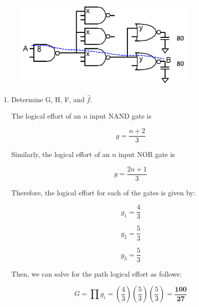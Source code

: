\documentclass[fleqn]{article}
\begin{document}
\begin{enumerate}
			\begin{figure}[H]				
			\centerline{\includegraphics[width=0.8\textwidth]{circuit_question5.png}}
			\label{fig::circuit_question5}
			\end{figure}
		
			\begin{enumerate}
				\item Determine G, H, F, and $\hat{f}$.
				
				The logical effort of an $n$ input NAND gate is
				
				\begin{equation*}
					g = \frac{n+2}{3}
				\end{equation*}
				
				Similarly, the logical effort of an $n$ input NOR gate is
				
				\begin{equation*}
					g = \frac{2n+1}{3}
				\end{equation*}
				
				Therefore, the logical effort for each of the gates is given by:
				
				\begin{equation*}
					g_1 = \frac{4}{3}
				\end{equation*}
				
				\begin{equation*}
					g_2 = \frac{5}{3}
				\end{equation*}
				
				\begin{equation*}
					g_3 = \frac{5}{3}
				\end{equation*}
				
				Then, we can solve for the path logical effort as follows:
				
				\begin{equation*}
					G = \prod{g_i} = \left(\frac{4}{3}\right)\left(\frac{5}{3}\right)\left(\frac{5}{3}\right) = \mathbf{\frac{100}{27}}
				\end{equation*}
				

\end{enumerate}
\end{enumerate}
\end{document}
